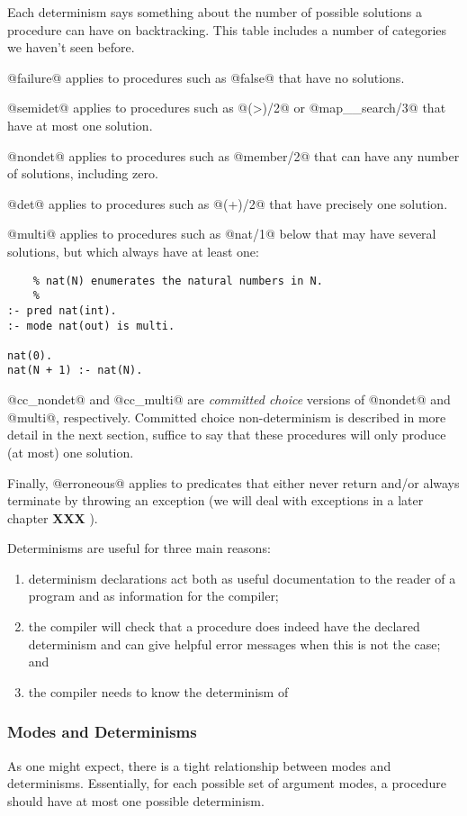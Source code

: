 \documentclass[a4paper,11pt,notitlepage,onecolumn]{article}
\newcommand{\XXX}[1]%
{{\small\textbf{XXX} \emph{#1}}}
\begin{document}
Each determinism says something about the number of possible
solutions a procedure can have on backtracking.  This table
includes a number of categories we haven't seen before.

@failure@ applies to procedures such as @false@ that have no
solutions.

@semidet@ applies to procedures such as @(>)/2@ or @map__search/3@
that have at most one solution.

@nondet@ applies to procedures such as @member/2@ that can have
any number of solutions, including zero.

@det@ applies to procedures such as @(+)/2@ that have precisely
one solution.

@multi@ applies to procedures such as @nat/1@ below that may have
several solutions, but which always have at least one:
\begin{verbatim}
    % nat(N) enumerates the natural numbers in N.
    %
:- pred nat(int).
:- mode nat(out) is multi.

nat(0).
nat(N + 1) :- nat(N).
\end{verbatim}
@cc_nondet@ and @cc_multi@ are \emph{committed choice} versions of
@nondet@ and @multi@, respectively.  Committed choice
non-determinism is described in more detail in the next
section, suffice to say that these procedures will only
produce (at most) one solution.

Finally, @erroneous@ applies to predicates that either never
return and/or always terminate by throwing an exception (we
will deal with exceptions in a later chapter \XXX{}).

Determinisms are useful for three main reasons:
\begin{enumerate}
\item determinism declarations act both as useful documentation
  to the reader of a program and as information for the
  compiler;
\item the compiler will check that a procedure does indeed have
  the declared determinism and can give helpful error messages
  when this is not the case; and
\item the compiler needs to know the determinism of
\end{enumerate}

\subsubsection{Modes and Determinisms}

As one might expect, there is a tight relationship between
modes and determinisms.  Essentially, for each possible
set of argument modes, a procedure should have at most one
possible determinism.
\end{document}

